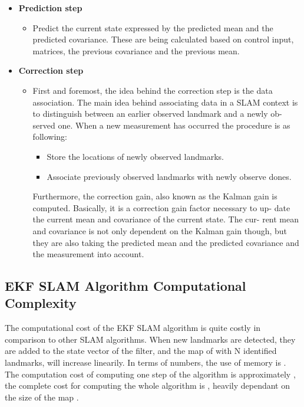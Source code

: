 \begin{itemize}
  \item \textbf{Prediction step}
    \begin{itemize}
        \item \textbf{}
        Predict the current state expressed by the predicted mean and the predicted covariance. These are being calculated based on control input, matrices, the previous covariance and the previous mean. \cite{cyrill2012}
    \end{itemize}
  \item \textbf{Correction step}
    \begin{itemize}
        \item \textbf{}
        First and foremost, the idea behind the correction step is the data association. The main idea behind associating data in a SLAM context is to distinguish between an earlier observed landmark and a newly ob- served one. \cite{cyrill2012} When a new measurement has occurred the procedure is as following:
        
        \begin{itemize}
            \item Store the locations of newly observed landmarks.\cite{cyrill2012}
            \item Associate previously observed landmarks with newly observe dones. \cite{cyrill2012}
        \end{itemize}
        
        Furthermore, the correction gain, also known as the Kalman gain is computed. Basically, it is a correction gain factor necessary to up- date the current mean and covariance of the current state. The cur- rent mean and covariance is not only dependent on the Kalman gain though, but they are also taking the predicted mean and the predicted covariance and the measurement into account. \cite{cyrill2012}
    \end{itemize}
  
\end{itemize}

\subsection{EKF SLAM Algorithm Computational Complexity}
The computational cost of the EKF SLAM algorithm is quite costly in comparison to other SLAM algorithms. When new landmarks are detected, they are added to the state vector of the filter, and the map of with N identified landmarks, will increase linearily. \cite{samsuri2015} In terms of numbers, the use of memory is  . The computation cost of computing one step of the algorithm is approximately  \cite{cyrill2012} \cite{bozao2010}, the complete cost for computing the whole algorithm is , heavily dependant on the size of the map \cite{bozao2010}.



